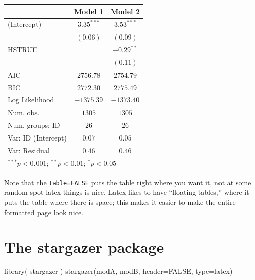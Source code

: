 \documentclass[
  letterpaper,
  DIV=11,
  numbers=noendperiod]{scrreprt}
\newenvironment{Shaded}{}{}
\newcommand{\AttributeTok}[1]{\textcolor[rgb]{0.49,0.56,0.16}{#1}}
\newcommand{\ConstantTok}[1]{\textcolor[rgb]{0.53,0.00,0.00}{#1}}
\newcommand{\FunctionTok}[1]{\textcolor[rgb]{0.02,0.16,0.49}{#1}}
\newcommand{\NormalTok}[1]{#1}
\newcommand{\StringTok}[1]{\textcolor[rgb]{0.25,0.44,0.63}{#1}}
\begin{document}
\begin{tabular}{l c c}
\hline
 & Model 1 & Model 2 \\
\hline
(Intercept)         & $3.35^{***}$ & $3.53^{***}$ \\
                    & $(0.06)$     & $(0.09)$     \\
HSTRUE              &              & $-0.29^{**}$ \\
                    &              & $(0.11)$     \\
\hline
AIC                 & $2756.78$    & $2754.79$    \\
BIC                 & $2772.30$    & $2775.49$    \\
Log Likelihood      & $-1375.39$   & $-1373.40$   \\
Num. obs.           & $1305$       & $1305$       \\
Num. groups: ID     & $26$         & $26$         \\
Var: ID (Intercept) & $0.07$       & $0.05$       \\
Var: Residual       & $0.46$       & $0.46$       \\
\hline
\multicolumn{3}{l}{\scriptsize{$^{***}p<0.001$; $^{**}p<0.01$; $^{*}p<0.05$}}
\end{tabular}

Note that the \texttt{table=FALSE} puts the table right where you want
it, not at some random spot latex things is nice. Latex likes to have
``floating tables,'' where it puts the table where there is space; this
makes it easier to make the entire formatted page look nice.

\section{The stargazer package}\label{the-stargazer-package}

\begin{Shaded}
\begin{Highlighting}[]
\FunctionTok{library}\NormalTok{( stargazer )}
\FunctionTok{stargazer}\NormalTok{(modA, modB, }\AttributeTok{header=}\ConstantTok{FALSE}\NormalTok{, }\AttributeTok{type=}\StringTok{\textquotesingle{}latex\textquotesingle{}}\NormalTok{)}
\end{Highlighting}
\end{Shaded}
\end{document}
